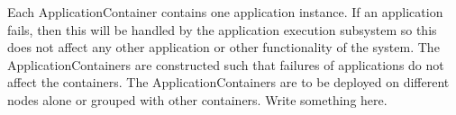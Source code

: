         Each ApplicationContainer contains one application instance. If an application fails,
        then this will be handled by the application execution subsystem so this
        does not affect any other application or other functionality of the system.
        The ApplicationContainers are constructed such that failures of applications
        do not affect the containers. The ApplicationContainers are to be deployed
        on different nodes alone or grouped with other containers. Write something here.




